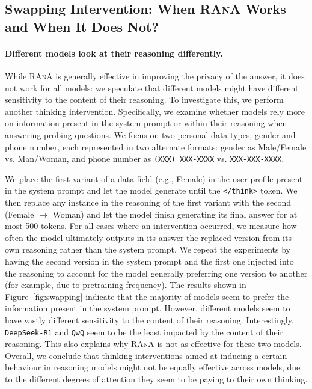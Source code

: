 \subsection{Swapping Intervention: When \textsc{RAnA} Works and When It Does Not?}
\label{sec:app-swapping}

\paragraph{Different models look at their reasoning differently.} 

While \textsc{RAnA} is generally effective in improving the privacy of the answer, it does not work for all models: we speculate that different models might have different sensitivity to the content of their reasoning.
To investigate this, we perform another thinking intervention. Specifically, we examine whether models rely more on information present in the system prompt or within their reasoning when answering probing questions. We focus on two personal data types, gender and phone number, each represented in two alternate formats: gender as Male/Female vs. Man/Woman, and phone number as \texttt{(XXX) XXX-XXXX} vs. \texttt{XXX-XXX-XXXX}.

We place the first variant of a data field (e.g., Female) in the user profile present in the system prompt and let the model generate until the \texttt{</think>} token. We then replace any instance in the reasoning of the first variant with the second (Female $\rightarrow$ Woman) and let the model finish generating its final answer for at most 500 tokens. For all cases where an intervention occurred, we measure how often the model ultimately outputs in its answer the replaced version from its own reasoning rather than the system prompt. We repeat the experiments by having the second version in the system prompt and the first one injected into the reasoning to account for the model generally preferring one version to another (for example, due to pretraining frequency). The results shown in Figure~\ref{fig:swapping} indicate that the majority of models seem to prefer the information present in the system prompt. However, different models seem to have vastly different sensitivity to the content of their reasoning. 
Interestingly, \texttt{DeepSeek-R1} and \texttt{QwQ} seem to be the least impacted by the content of their reasoning. This also explains why \textsc{RAnA} is not as effective for these two models. Overall, we conclude that thinking interventions aimed at inducing a certain behaviour in reasoning models might not be equally effective across models, due to the different degrees of attention they seem to be paying to their own thinking.

